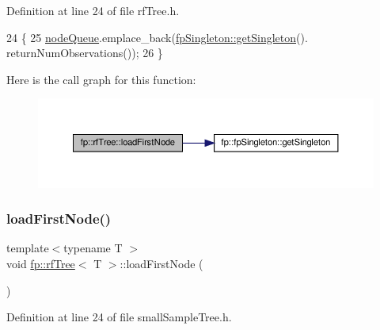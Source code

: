 Definition at line 24 of file rf\+Tree.\+h.


\begin{DoxyCode}
24                                     \{
25                     \hyperlink{classfp_1_1rfTree_af72d0a2f930fd480dfb4858885c2df23}{nodeQueue}.emplace\_back(\hyperlink{classfp_1_1fpSingleton_a8bdae77b68521003e3fc630edec2e240}{fpSingleton::getSingleton}().
      returnNumObservations());
26                 \}
\end{DoxyCode}
Here is the call graph for this function\+:
\nopagebreak
\begin{figure}[H]
\begin{center}
\leavevmode
\includegraphics[width=350pt]{classfp_1_1rfTree_a8757adc28b68d0a99f95b8bc5d6a38db_cgraph}
\end{center}
\end{figure}
\mbox{\label{classfp_1_1rfTree_a8757adc28b68d0a99f95b8bc5d6a38db}} 
\subsubsection{\texorpdfstring{load\+First\+Node()}{loadFirstNode()}\hspace{0.1cm}{\footnotesize\ttfamily [2/2]}}
{\footnotesize\ttfamily template$<$typename T $>$ \\
void \hyperlink{classfp_1_1rfTree}{fp\+::rf\+Tree}$<$ T $>$\+::load\+First\+Node (\begin{DoxyParamCaption}{ }\end{DoxyParamCaption})\hspace{0.3cm}{\ttfamily [inline]}}



Definition at line 24 of file small\+Sample\+Tree.\+h.


